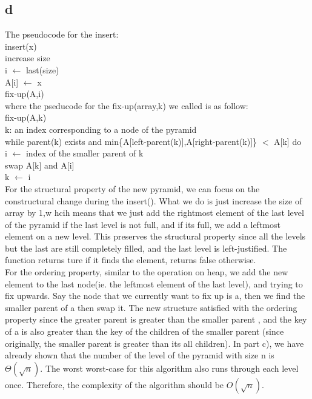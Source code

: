 \documentclass[12pt]{article}
\begin{document}
\begin{itemize}
		\part{d}
		The pseudocode for the insert:\\
		
		insert(x)\\
		increase size\\
		i $\gets$ last(size)\\
		A[i] $\gets$ x\\
		fix-up(A,i)\\
		
		where the pseducode for the fix-up(array,k) we called is as follow:\\
		
		fix-up(A,k)\\
		k: an index corresponding to a node of the pyramid\\
		while parent(k) exists and min\{A[left-parent(k)],A[right-parent(k)]\} $<$ A[k] do\\
		\hphantom{1111} i $\gets$ index of the smaller parent of k\\
		\hphantom{1111} swap A[k] and A[i]\\
		\hphantom{1111} k $\gets$ i\\
		
		For the structural property of the new pyramid, we can focus on the constructural change during the insert(). What we do is just increase the size of array by 1,w hcih means that we just add the rightmost element of the last level of the pyramid if the last level is not full, and if its full, we add a leftmost element on a new level. This preserves the structural property since all the levels but the last are still completely filled, and the last level is left-justified. The function returns ture if it finds the element, returns false otherwise.\\
		For the ordering property, similar to the operation on heap, we add the new element to the last node(ie. the leftmost element of the last level), and trying to fix upwards. Say the node that we currently want to fix up is a, then we find the smaller parent of a then swap it. The new structure satisfied with the ordering property since the greater parent is greater than the smaller parent , and the key of a is also greater than the key of the children of the smaller parent (since originally, the smaller parent is greater than its all children).
		In part c), we have already shown that the number of the level of the pyramid with size n is $\Theta(\sqrt{n})$. The worst worst-case for this algorithm also runs through each level once. Therefore, the complexity of the algorithm should be $O(\sqrt{n})$.\\	
			

\end{itemize}
\end{document}
